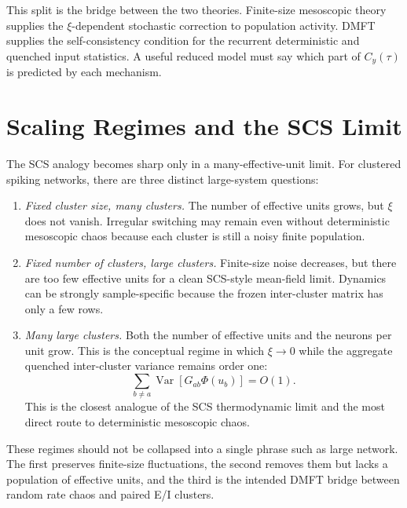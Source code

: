 This split is the bridge between the two theories. Finite-size mesoscopic
theory supplies the \(\xi\)-dependent stochastic correction to population
activity. DMFT supplies the self-consistency condition for the recurrent
deterministic and quenched input statistics. A useful reduced model must say
which part of \(C_y(\tau)\) is predicted by each mechanism.

\section{Scaling Regimes and the SCS Limit}
\label{sec:ch07-scaling-regimes-scs-limit}

The SCS analogy becomes sharp only in a many-effective-unit limit. For clustered
spiking networks, there are three distinct large-system questions:

\begin{enumerate}
    \item \emph{Fixed cluster size, many clusters.} The number of effective
    units grows, but \(\xi\) does not vanish. Irregular switching may remain
    even without deterministic mesoscopic chaos because each cluster is still a
    noisy finite population.

    \item \emph{Fixed number of clusters, large clusters.} Finite-size noise
    decreases, but there are too few effective units for a clean SCS-style
    mean-field limit. Dynamics can be strongly sample-specific because the
    frozen inter-cluster matrix has only a few rows.

    \item \emph{Many large clusters.} Both the number of effective units and
    the neurons per unit grow. This is the conceptual regime in which
    \(\xi\to0\) while the aggregate quenched inter-cluster variance remains
    order one:
    \[
        \sum_{b\ne a}
        \operatorname{Var}
        \left[
        G_{ab}\Phi(u_b)
        \right]
        =
        O(1).
        \label{eq:ch07-aggregate-quenched-variance}
    \]
    This is the closest analogue of the SCS thermodynamic limit and the most
    direct route to deterministic mesoscopic chaos.
\end{enumerate}

These regimes should not be collapsed into a single phrase such as large
network. The first preserves finite-size fluctuations, the second removes
them but lacks a population of effective units, and the third is the intended
DMFT bridge between random rate chaos and paired E/I clusters.

